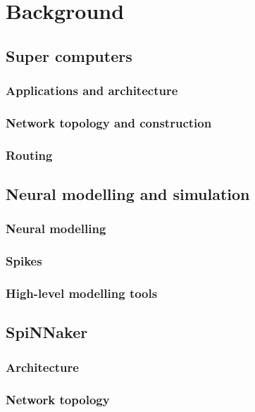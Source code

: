 \chapter{Background}

	\section{Super computers}
		\subsection{Applications and architecture}
		\subsection{Network topology and construction}
		\subsection{Routing}
	
	\section{Neural modelling and simulation}
		\subsection{Neural modelling}
		\subsection{Spikes}
		\subsection{High-level modelling tools}
	
	\section{SpiNNaker}
		\subsection{Architecture}
		\subsection{Network topology}
		
			
			
